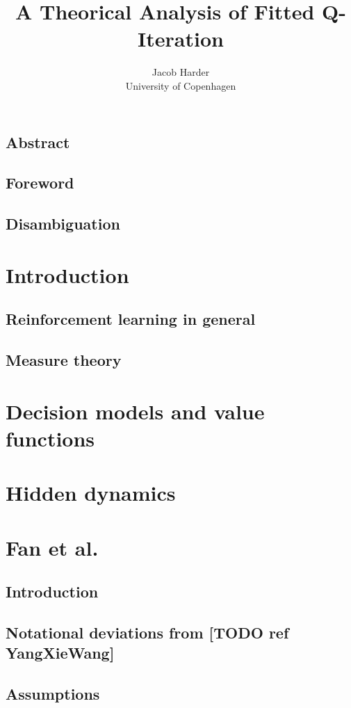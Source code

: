 \documentclass{article}
\title{A Theorical Analysis of Fitted Q-Iteration}
\author{Jacob Harder \\ University of Copenhagen}
\begin{document}
\maketitle

\subsection{Abstract}
\subsection{Foreword}

\subsection{Disambiguation}

\section{Introduction}

\subsection{Reinforcement learning in general}

\subsection{Measure theory}

\section{Decision models and value functions}

\section{Hidden dynamics}

\section{Fan et al.}
\subsection{Introduction}

\subsection{Notational deviations from [TODO ref YangXieWang]}

\subsection{Assumptions}

\end{document}
